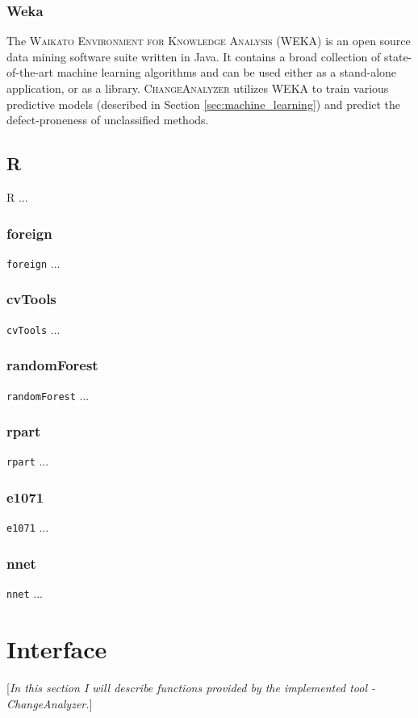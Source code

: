 \documentclass{pracamgr}
\begin{document}
\subsubsection*{Weka}
The \textsc{Waikato Environment for Knowledge Analysis} (WEKA) \cite{weka} is an open source data mining software suite written in Java. It contains a broad collection of state-of-the-art machine learning algorithms and can be used either as a stand-alone application, or as a library. \textsc{ChangeAnalyzer} utilizes WEKA to train various predictive models (described in Section \ref{sec:machine_learning}) and predict the defect-proneness of unclassified methods.

\subsection{R}

R \cite{r} ...

\subsubsection*{foreign}
\texttt{foreign} \cite{foreign} ...

\subsubsection*{cvTools}
\texttt{cvTools} \cite{cvTools} ...

\subsubsection*{randomForest}
\texttt{randomForest} \cite{randomForest} ...

\subsubsection*{rpart}
\texttt{rpart} \cite{rpart} ...

\subsubsection*{e1071}
\texttt{e1071} \cite{e1071} ...

\subsubsection*{nnet}
\texttt{nnet} \cite{nnet} ...

\section{Interface}
\label{sec:interface}
[\textit{In this section I will describe functions provided by the implemented tool - ChangeAnalyzer.}]
\end{document}
